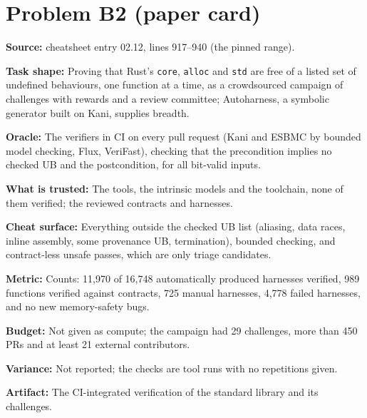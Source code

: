 \documentclass[11pt]{article}
\begin{document}
\section*{Problem B2 (paper card)}\label{ans:B2}
\begin{answer}
\textbf{Source:} cheatsheet entry 02.12, lines 917--940 (the pinned range).

\textbf{Task shape:} Proving that Rust's \texttt{core}, \texttt{alloc} and
\texttt{std} are free of a listed set of undefined behaviours, one function at
a time, as a crowdsourced campaign of challenges with rewards and a review
committee; Autoharness, a symbolic generator built on Kani, supplies breadth.

\textbf{Oracle:} The verifiers in CI on every pull request (Kani and ESBMC by
bounded model checking, Flux, VeriFast), checking that the precondition
implies no checked UB and the postcondition, for all bit-valid inputs.

\textbf{What is trusted:} The tools, the intrinsic models and the toolchain,
none of them verified; the reviewed contracts and harnesses.

\textbf{Cheat surface:} Everything outside the checked UB list (aliasing,
data races, inline assembly, some provenance UB, termination), bounded
checking, and contract-less unsafe passes, which are only triage candidates.

\textbf{Metric:} Counts: 11,970 of 16,748 automatically produced harnesses
verified, 989 functions verified against contracts, 725 manual harnesses,
4,778 failed harnesses, and no new memory-safety bugs.

\textbf{Budget:} Not given as compute; the campaign had 29 challenges, more
than 450 PRs and at least 21 external contributors.

\textbf{Variance:} Not reported; the checks are tool runs with no
repetitions given.

\textbf{Artifact:} The CI-integrated verification of the standard library
and its challenges.
\end{answer}
\end{document}
